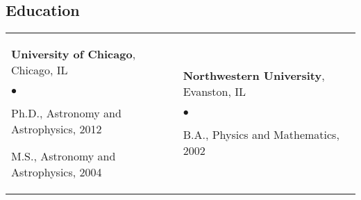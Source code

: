 \documentclass[margin,line, 11pt]{res}
\newenvironment{list2}{
  \begin{list}{$\bullet$}{%
      \setlength{\itemsep}{0in}
      \setlength{\parsep}{0in} \setlength{\parskip}{0in}
      \setlength{\topsep}{0in} \setlength{\partopsep}{0in}
      \setlength{\leftmargin}{0.2in}}}{\end{list}}
\begin{document}
\begin{resume}
\section{Education}
\begin{tabular}{@{}p{3in}p{3in}}
  \textbf{University of Chicago}, Chicago, IL
  \begin{list2}
  	\item Ph.D., Astronomy and Astrophysics, 2012
    \item M.S., Astronomy and Astrophysics, 2004
  \end{list2} &
  \textbf{Northwestern University}, Evanston, IL
  \begin{list2}
  	\item B.A., Physics and Mathematics, 2002
  \end{list2} \\
\end{tabular}
\vspace*{-4mm}

\end{resume}
\end{document}
